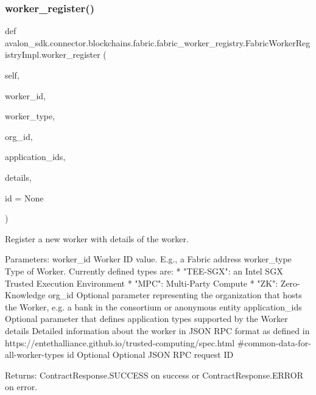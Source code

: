 \subsubsection{\texorpdfstring{worker\+\_\+register()}{worker\_register()}}
{\footnotesize\ttfamily def avalon\+\_\+sdk.\+connector.\+blockchains.\+fabric.\+fabric\+\_\+worker\+\_\+registry.\+Fabric\+Worker\+Registry\+Impl.\+worker\+\_\+register (\begin{DoxyParamCaption}\item[{}]{self,  }\item[{}]{worker\+\_\+id,  }\item[{}]{worker\+\_\+type,  }\item[{}]{org\+\_\+id,  }\item[{}]{application\+\_\+ids,  }\item[{}]{details,  }\item[{}]{id = {\ttfamily None} }\end{DoxyParamCaption})}

\begin{DoxyVerb}Register a new worker with details of the worker.

Parameters:
worker_id       Worker ID value. E.g., a Fabric address
worker_type     Type of Worker. Currently defined types are:
        * "TEE-SGX": an Intel SGX Trusted Execution
          Environment
        * "MPC": Multi-Party Compute
        * "ZK": Zero-Knowledge
org_id          Optional parameter representing the
        organization that hosts the Worker,
        e.g. a bank in the consortium or
        anonymous entity
application_ids Optional parameter that defines
        application types supported by the Worker
details         Detailed information about the worker in
        JSON RPC format as defined in
https://entethalliance.github.io/trusted-computing/spec.html
#common-data-for-all-worker-types
id              Optional Optional JSON RPC request ID

Returns:
ContractResponse.SUCCESS on success or
ContractResponse.ERROR on error.
\end{DoxyVerb}
 \mbox{\label{classavalon__sdk_1_1connector_1_1blockchains_1_1fabric_1_1fabric__worker__registry_1_1FabricWorkerRegistryImpl_a98651da17a2c3766a2cdfe562b3714eb}} 
